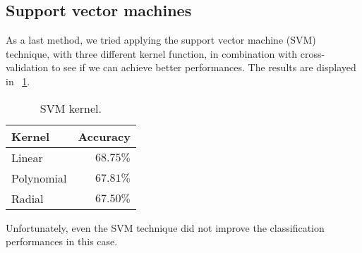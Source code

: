 \subsection{Support vector machines}

As a last method, we tried applying the support vector machine (SVM) technique, with three different kernel function, in combination with cross-validation to see if we can achieve better performances. The results are displayed in \Tab~\ref{table:SVMkernels}.

\begin{table}[H]
	\centering
	\begin{tabular}{|| l | r ||} 
		\hline
		Kernel & Accuracy \\
		\hline
		Linear & $68.75\%$ \\
		\hline
		Polynomial & $67.81\%$ \\
		\hline
		Radial & $67.50\%$ \\
		\hline
	\end{tabular}
	\caption{SVM kernel.}
	\label{table:SVMkernels}
\end{table} 

Unfortunately, even the SVM technique did not improve the classification performances in this case. 

\begin{center}
	
	
	
	
\end{center}